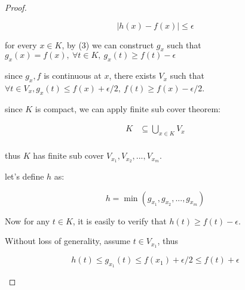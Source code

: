 \begin{proof}
\begin{enumerate}
        \[
            \left| h(x) -f(x) \right| \le \epsilon
        \]

        for every $x \in K$, by (3) we can construct $g_x$ such that $g_x(x) = f(x), \: \forall t \in K,\: g_x(t) \ge f(t) - \epsilon$

        since $g_x, f$ is continuous at $x$, there exists $V_x$ such that $\forall t \in V_x, g_x(t) \le f(x) + \epsilon/2,\: f(t) \ge f(x) -\epsilon/2$. 

        since $K$ is compact, we can apply finite sub cover theorem:

        \begin{align*}
            K &\subseteq \bigcup_{x \in K} V_x \\
        \end{align*}

        thus $K$ has finite sub cover $V_{x_1}, V_{x_2}, ..., V_{x_m}$.

        let's define $h$ as:

        \[
            h = \min(g_{x_1}, g_{x_2}, ..., g_{x_m})
        \]

        Now for any $t \in K$, it is easily to verify that $h(t) \ge f(t) - \epsilon$. 

        Without loss of generality, assume $t \in V_{x_1}$, thus

        \[
            h(t) \le g_{x_1}(t) \le f(x_1) + \epsilon / 2 \le f(t) + \epsilon
        \]
    \end{enumerate}
\end{proof}
